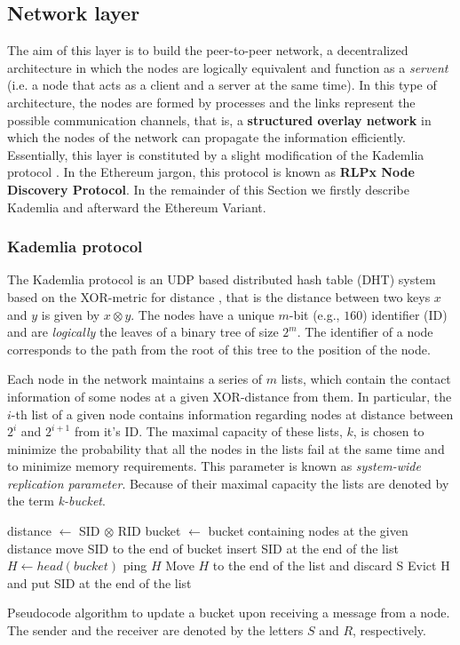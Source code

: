 \subsection{Network layer}
\label{sec:network-layer}

The aim of this layer is to build the peer-to-peer network, a decentralized
architecture in which the nodes are logically equivalent and function as a
\emph{servent} (i.e. a node that acts as a client and a server at the same
time). In this type of architecture, the nodes are formed by processes and the
links represent the possible communication channels, that is, a
\textbf{structured overlay network} \cite{van2017distributed} in which the nodes
of the network can propagate the information efficiently. Essentially, this
layer is constituted by a slight modification of the Kademlia protocol
\cite{bib:kademlia}. In the Ethereum jargon, this protocol is known as
\textbf{RLPx Node Discovery Protocol}.
In the remainder of this Section we firstly describe Kademlia and afterward
the Ethereum Variant.


\subsubsection{Kademlia protocol}
The Kademlia protocol is an UDP based distributed hash table (DHT)
system based on the
XOR-metric for distance \cite{bib:kademlia}, that is the distance between two
keys $x$ and $y$ is given by $x \otimes y$.
The nodes have a unique $m$-bit (e.g., $160$) identifier (ID) and are 
\emph{logically} the leaves of a binary tree of size $2^m$. 
The identifier of a node corresponds
to the path from the root of this tree to the position of the node.

Each node in the network maintains a series of $m$
lists, which contain the contact information of some nodes at a given
XOR-distance from them.
In particular, the $i$-th list of a given node contains
information regarding nodes at distance between $2^i$ and $2^{i+1}$ from 
it's ID.
The maximal capacity of these lists, $k$, is chosen to minimize the
probability that all the nodes in the lists fail at the same 
time and to minimize memory requirements.
This parameter is  known as \emph{system-wide replication parameter}.
Because of their maximal capacity the lists are denoted by the term
\emph{k-bucket}.


\begin{algorithm}[t]
	\begin{algorithmic}
		\State distance $\gets$ SID $\otimes$ RID
		\State bucket $\gets$ bucket containing nodes at the given distance
		\State move SID to the end of bucket
		\Else
		\State insert SID at the end of the list
		\Else
		\State $H \gets head(bucket)$
		\State ping $H$
		\State Move $H$ to the end of the list and discard S
		\Else
		\State Evict H and put SID at the end of the list
		\EndIf
		\EndIf
		\EndIf
	\end{algorithmic}
	\caption{Pseudocode algorithm to update a bucket upon receiving a message from a node. The sender and the receiver are denoted by the letters $S$ and $R$, respectively.}
	\label{alg:kademlia:update}
\end{algorithm}

